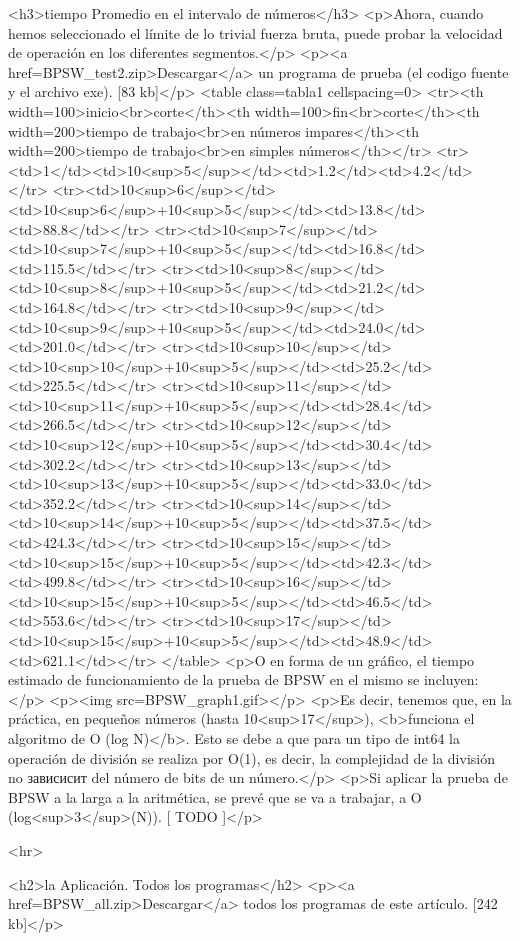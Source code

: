<h3>tiempo Promedio en el intervalo de números</h3>
<p>Ahora, cuando hemos seleccionado el límite de lo trivial fuerza bruta, puede probar la velocidad de operación en los diferentes segmentos.</p>
<p><a href=BPSW_test2.zip>Descargar</a> un programa de prueba (el codigo fuente y el archivo exe). [83 kb]</p>
<table class=tabla1 cellspacing=0>
<tr><th width=100>inicio<br>corte</th><th width=100>fin<br>corte</th><th width=200>tiempo de trabajo<br>en números impares</th><th width=200>tiempo de trabajo<br>en simples números</th></tr>
<tr><td>1</td><td>10<sup>5</sup></td><td>1.2</td><td>4.2</td></tr>
<tr><td>10<sup>6</sup></td><td>10<sup>6</sup>+10<sup>5</sup></td><td>13.8</td><td>88.8</td></tr>
<tr><td>10<sup>7</sup></td><td>10<sup>7</sup>+10<sup>5</sup></td><td>16.8</td><td>115.5</td></tr>
<tr><td>10<sup>8</sup></td><td>10<sup>8</sup>+10<sup>5</sup></td><td>21.2</td><td>164.8</td></tr>
<tr><td>10<sup>9</sup></td><td>10<sup>9</sup>+10<sup>5</sup></td><td>24.0</td><td>201.0</td></tr>
<tr><td>10<sup>10</sup></td><td>10<sup>10</sup>+10<sup>5</sup></td><td>25.2</td><td>225.5</td></tr>
<tr><td>10<sup>11</sup></td><td>10<sup>11</sup>+10<sup>5</sup></td><td>28.4</td><td>266.5</td></tr>
<tr><td>10<sup>12</sup></td><td>10<sup>12</sup>+10<sup>5</sup></td><td>30.4</td><td>302.2</td></tr>
<tr><td>10<sup>13</sup></td><td>10<sup>13</sup>+10<sup>5</sup></td><td>33.0</td><td>352.2</td></tr>
<tr><td>10<sup>14</sup></td><td>10<sup>14</sup>+10<sup>5</sup></td><td>37.5</td><td>424.3</td></tr>
<tr><td>10<sup>15</sup></td><td>10<sup>15</sup>+10<sup>5</sup></td><td>42.3</td><td>499.8</td></tr>
<tr><td>10<sup>16</sup></td><td>10<sup>15</sup>+10<sup>5</sup></td><td>46.5</td><td>553.6</td></tr>
<tr><td>10<sup>17</sup></td><td>10<sup>15</sup>+10<sup>5</sup></td><td>48.9</td><td>621.1</td></tr>
</table>
<p>O en forma de un gráfico, el tiempo estimado de funcionamiento de la prueba de BPSW en el mismo se incluyen:</p>
<p><img src=BPSW_graph1.gif></p>
<p>Es decir, tenemos que, en la práctica, en pequeños números (hasta 10<sup>17</sup>), <b>funciona el algoritmo de O (log N)</b>. Esto se debe a que para un tipo de int64 la operación de división se realiza por O(1), es decir, la complejidad de la división no зависисит del número de bits de un número.</p>
<p>Si aplicar la prueba de BPSW a la larga a la aritmética, se prevé que se va a trabajar, a O (log<sup>3</sup>(N)). [ TODO ]</p>

<hr>

<h2>la Aplicación. Todos los programas</h2>
<p><a href=BPSW_all.zip>Descargar</a> todos los programas de este artículo. [242 kb]</p>

